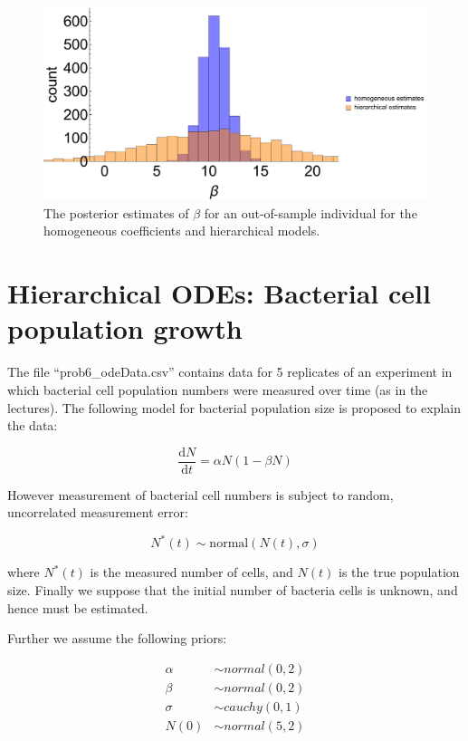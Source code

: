 \documentclass{article}
\begin{document}
\begin{figure}[ht]
	\centerline{\includegraphics[width=1\textwidth]{figures/lec6_sleepHierarchicalBetaOverall.pdf}}
	\caption{The posterior estimates of $\beta$ for an out-of-sample individual for the homogeneous coefficients and hierarchical models.}\label{fig:lec6_sleepOverall}
\end{figure}

\section{Hierarchical ODEs: Bacterial cell population growth}
	The file ``prob6\_odeData.csv'' contains data for 5 replicates of an experiment in which bacterial cell population numbers were measured over time (as in the lectures). The following model for bacterial population size is proposed to explain the data:
	
\begin{equation}
\frac{\mathrm{d}N}{\mathrm{d}t} = \alpha N (1-\beta N)
\end{equation}

However measurement of bacterial cell numbers is subject to random, uncorrelated measurement error:

\begin{equation}
N^*(t) \sim \text{normal}(N(t), \sigma)
\end{equation}

where $N^*(t)$ is the measured number of cells, and $N(t)$ is the true population size. Finally we suppose that the initial number of bacteria cells is unknown, and hence must be estimated.

Further we assume the following priors:

\begin{align*}
\alpha&\sim normal(0,2)\\
\beta&\sim normal(0,2)\\
\sigma&\sim cauchy(0,1)\\
N(0) &\sim normal(5,2)
\end{align*}
\end{document}
